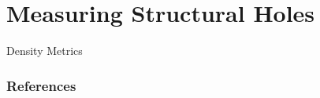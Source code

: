 \documentclass[notes, aspectratio=1610]{beamer}
\begin{document}
\section{Measuring Structural Holes}

\begin{frame}{Density Metrics}
\end{frame}

\begin{frame}
	\frametitle{References}
	\printbibliography
 \end{frame} 

\end{document}
